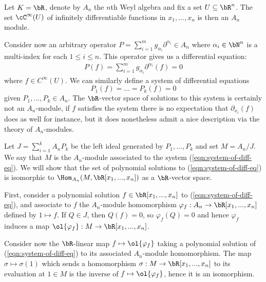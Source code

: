 \begin{example}\label{example:d-mod-differential-equation}
	Let $K = \bR$, denote by $A_n$ the $n$th Weyl algebra and fix a set $U \subseteq \bR^n$. The set $\cC^\infty(U)$ of infinitely differentiable functions in $x_1,...,x_n$ is then an $A_n$ module.

	Consider now an arbitrary operator $P = \sum_{i=1}^m g_{\alpha_i} \partial^{\alpha_i} \in A_n$ where $\alpha_i \in \bN^n$ is a multi-index for each $1\leq i\leq n$. This operator gives us a differential equation:
	\begin{align*}
		P(f) = \sum_{i=1}^m g_{\alpha_i}\partial^{\alpha_i}(f) = 0
	\end{align*}
	where $f \in C^\infty(U)$. We can similarly define a system of differential equations
	\begin{equation}\label{eqn:system-of-diff-eq}
		P_1(f) = ... = P_k(f) = 0
	\end{equation}
	given $P_1,...,P_k \in A_n$. The $\bR$-vector space of solutions to this system is certainly not an $A_n$-module, if $f$ satisfies the system there is no expectation that $\partial_{x_i}(f)$ does as well for instance, but it does nonetheless admit a nice description via the theory of $A_n$-modules.

	Let $J = \sum_{i=1}^k A_nP_k$ be the left ideal generated by $P_1,...,P_k$ and set $M = A_n/J$. We say that $M$ is the $A_n$-module associated to the system (\ref{eqn:system-of-diff-eq}). We will show that the set of polynomial solutions to (\ref{eqn:system-of-diff-eq}) is isomorphic to $\Hom_{A_n}(M,\bR[x_1,...,x_n])$ as a $\bR$-vector space.

	First, consider a polynomial solution $f \in \bR[x_1,...,x_n]$ to (\ref{eqn:system-of-diff-eq}), and associate to $f$ the $A_n$-module homomorphism $\varphi_f:A_n\to \bR[x_1,...,x_n]$ defined by $1 \mapsto f$. If $Q \in J$, then $Q(f) = 0$, so $\varphi_f(Q) = 0$ and hence $\varphi_f$ induces a map $\ol{\varphi_f}:M\to\bR[x_1,...,x_n]$.

	Consider now the $\bR$-linear map $f\mapsto \ol{\varphi_f}$ taking a polynomial solution of (\ref{eqn:system-of-diff-eq}) to its associated $A_n$-module homomorphism. The map $\sigma \mapsto \sigma(1)$ which sends a homomorphism $\sigma:M\to \bR[x_1,...,x_n]$ to its evaluation at $1 \in M$ is the inverse of $f\mapsto \ol{\varphi_f}$, hence it is an isomorphism.
\end{example}

